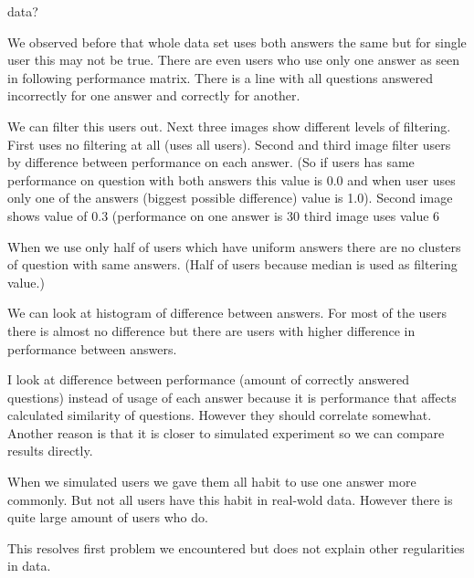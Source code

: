 \documentclass[
  digital, %
  table,   %
  nolof,     %
  nolot,     %
  nocover
]{fithesis3}
\begin{document}
data?


We observed before that whole data set uses both answers the same but
for single user this may not be true. There are even users who use only
one answer as seen in following performance matrix. There is a line with
all questions answered incorrectly for one answer and correctly for
another.


We can filter this users out. Next three images show different levels of
filtering. First uses no filtering at all (uses all users). Second and
third image filter users by difference between performance on each
answer. (So if users has same performance on question with both answers
this value is 0.0 and when user uses only one of the answers (biggest
possible difference) value is 1.0). Second image shows value of 0.3
(performance on one answer is 30%
third image uses value 6%


When we use only half of users which have uniform answers there are no
clusters of question with same answers. (Half of users because median is
used as filtering value.)

We can look at histogram of difference between answers. For most of the
users there is almost no difference but there are users with higher
difference in performance between answers.


I look at difference between performance (amount of correctly answered
questions) instead of usage of each answer because it is performance
that affects calculated similarity of questions. However they should
correlate somewhat. Another reason is that it is closer to simulated
experiment so we can compare results directly.

When we simulated users we gave them all habit to use one answer more
commonly. But not all users have this habit in real-wold data. However
there is quite large amount of users who do.

This resolves first problem we encountered but does not explain other
regularities in data.
\end{document}
